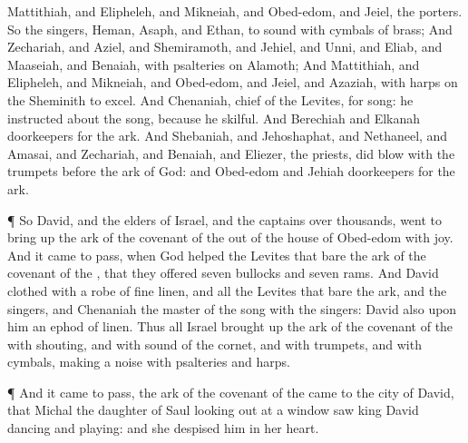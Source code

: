 {Mattithiah, and
Elipheleh, and
Mikneiah, and
Obed-edom, and
Jeiel, the
porters.
So the
singers,
Heman,
Asaph, and
Ethan,
{} to
sound with
cymbals of
brass;
And
Zechariah, and
Aziel, and
Shemiramoth, and
Jehiel, and
Unni, and
Eliab, and
Maaseiah, and
Benaiah, with
psalteries on
Alamoth;
And
Mattithiah, and
Elipheleh, and
Mikneiah, and
Obed-edom, and
Jeiel, and
Azaziah, with
harps on the
Sheminith to
excel.
And
Chenaniah,
chief of the
Levites,
{} for
song: he
instructed about the
song, because he
{}
skilful.
And
Berechiah and
Elkanah
{}
doorkeepers for the
ark.
And
Shebaniah, and
Jehoshaphat, and
Nethaneel, and
Amasai, and
Zechariah, and
Benaiah, and
Eliezer, the
priests, did
blow with the
trumpets
before the
ark of
God: and
Obed-edom and
Jehiah
{}
doorkeepers for the
ark.
\par }{\PP {}¶ So
David, and the
elders of
Israel, and the
captains over
thousands,
went to bring
up the
ark of the
covenant of the
{} out of the
house of
Obed-edom with
joy.
And it came to pass, when
God
helped the
Levites that
bare the
ark of the
covenant of the
{}, that they
offered
seven
bullocks and
seven
rams.
And
David
{}
clothed with a
robe of fine
linen, and all the
Levites that
bare the
ark, and the
singers, and
Chenaniah the
master of the
song with the
singers:
David also
{} upon him an
ephod of
linen.
Thus all
Israel brought
up the
ark of the
covenant of the
{} with
shouting, and with
sound of the
cornet, and with
trumpets, and with
cymbals, making a
noise with
psalteries and
harps.
\par }{\PP {}¶ And it came to pass,
{} the
ark of the
covenant of the
{}
came to the
city of
David, that
Michal the
daughter of
Saul looking
out at a
window
saw
king
David
dancing and
playing: and she
despised him in her
heart.

}
